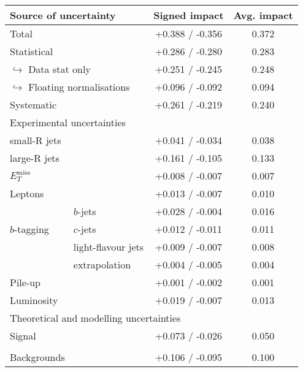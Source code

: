 \begin{table}[tbp]
	\footnotesize\centering
    \setlength{\tabcolsep}{0.5em} %
    \begin{center}
    \begin{tabular}{ l | l  c c }
        \toprule\hline
        \multicolumn{2}{l}{Source of uncertainty} & Signed impact & Avg. impact \\
        \midrule
        \multicolumn{2}{l}{Total} & +0.388 / -0.356  & 0.372 \\
        \multicolumn{2}{l}{Statistical} & +0.286 / -0.280  &  0.283 \\
        \multicolumn{2}{l}{$\hookrightarrow$ Data stat only} & +0.251 / -0.245  & 0.248 \\
        \multicolumn{2}{l}{$\hookrightarrow$ Floating normalisations} & +0.096 / -0.092  & 0.094 \\
        \multicolumn{2}{l}{Systematic} & +0.261 / -0.219  & 0.240 \\
        \midrule
        \multicolumn{4}{l}{Experimental uncertainties}\\
        \midrule
        \multicolumn{2}{l}{small-R jets} &  +0.041 / -0.034  &  0.038 \\
        \multicolumn{2}{l}{large-R jets} &  +0.161 / -0.105  & 0.133 \\
        \multicolumn{2}{l}{$E_{T}^{\textrm{miss}}$} & +0.008 / -0.007  & 0.007 \\
        \multicolumn{2}{l}{Leptons} & +0.013 / -0.007  & 0.010 \\
        \multirow{3}{*}{$b$-tagging~~~} & $b$-jets & +0.028 / -0.004  & 0.016 \\
        & $c$-jets &  +0.012 / -0.011  & 0.011 \\
        & light-flavour jets & +0.009 / -0.007  & 0.008 \\
        & extrapolation & +0.004 / -0.005  & 0.004 \\
        \multicolumn{2}{l}{Pile-up} & +0.001 / -0.002  & 0.001 \\
        \multicolumn{2}{l}{Luminosity} & +0.019 / -0.007  & 0.013 \\
        \midrule
        \multicolumn{4}{l}{Theoretical and modelling uncertainties}\\
        \midrule
        \multicolumn{2}{l}{Signal} & +0.073 / -0.026  & 0.050 \\
        \multicolumn{4}{l}{} \\
        \multicolumn{2}{l}{Backgrounds} & +0.106 / -0.095  & 0.100 \\

\end{tabular}
\end{center}
\end{table}
